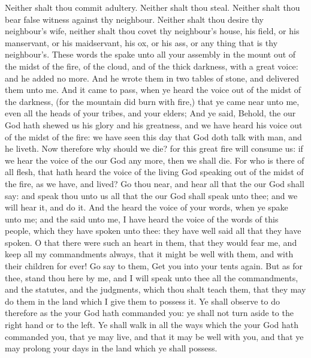 \begin{biblechapter}
\verse Neither shalt thou commit adultery.
\verse Neither shalt thou steal.
\verse Neither shalt thou bear false witness against thy neighbour.
\verse Neither shalt thou desire thy neighbour's wife, neither shalt thou covet thy neighbour's house, his field, or his manservant, or his maidservant, his ox, or his ass, or any thing that is thy neighbour's.
\verse These words the \LORD spake unto all your assembly in the mount out of the midst of the fire, of the cloud, and of the thick darkness, with a great voice: and he added no more. And he wrote them in two tables of stone, and delivered them unto me.
\verse And it came to pass, when ye heard the voice out of the midst of the darkness, (for the mountain did burn with fire,) that ye came near unto me, even all the heads of your tribes, and your elders;
\verse And ye said, Behold, the \LORD our God hath shewed us his glory and his greatness, and we have heard his voice out of the midst of the fire: we have seen this day that God doth talk with man, and he liveth.
\verse Now therefore why should we die? for this great fire will consume us: if we hear the voice of the \LORD our God any more, then we shall die.
\verse For who is there of all flesh, that hath heard the voice of the living God speaking out of the midst of the fire, as we have, and lived?
\verse Go thou near, and hear all that the \LORD our God shall say: and speak thou unto us all that the \LORD our God shall speak unto thee; and we will hear it, and do it.
\verse And the \LORD heard the voice of your words, when ye spake unto me; and the \LORD said unto me, I have heard the voice of the words of this people, which they have spoken unto thee: they have well said all that they have spoken.
\verse O that there were such an heart in them, that they would fear me, and keep all my commandments always, that it might be well with them, and with their children for ever!
\verse Go say to them, Get you into your tents again.
\verse But as for thee, stand thou here by me, and I will speak unto thee all the commandments, and the statutes, and the judgments, which thou shalt teach them, that they may do them in the land which I give them to possess it.
\verse Ye shall observe to do therefore as the \LORD your God hath commanded you: ye shall not turn aside to the right hand or to the left.
\verse Ye shall walk in all the ways which the \LORD your God hath commanded you, that ye may live, and that it may be well with you, and that ye may prolong your days in the land which ye shall possess.
\end{biblechapter}

